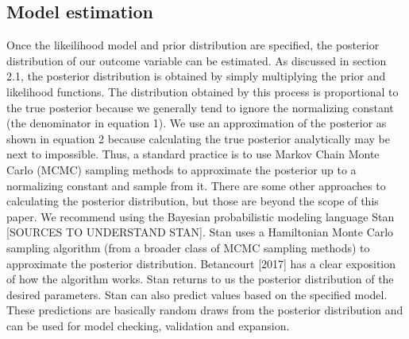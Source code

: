 \documentclass{article}
\begin{document}
\subsection{Model estimation}
Once the likeilihood model and prior distribution are specified, the posterior distribution of our outcome variable can be estimated. As discussed in section 2.1, the posterior distribution is obtained by simply multiplying the prior and likelihood functions. The distribution obtained by this process is proportional to the true posterior because we generally tend to ignore the normalizing constant (the denominator in equation 1). We use an approximation of the posterior as shown in equation 2 because calculating the true posterior analytically may be next to impossible.  Thus, a standard practice is to use Markov Chain Monte Carlo (MCMC) sampling methods to approximate the posterior up to a normalizing constant and sample from it. There are some other approaches to calculating the posterior distribution, but those are beyond the scope of this paper. We recommend using the Bayesian probabilistic modeling language Stan [SOURCES TO UNDERSTAND STAN]. Stan uses a Hamiltonian Monte Carlo sampling algorithm (from a broader class of MCMC sampling methods) to approximate the posterior distribution. Betancourt [2017] has a clear exposition of how the algorithm works. Stan returns to us the posterior distribution of the desired parameters. Stan can also predict values based on the specified model. These predictions are basically random draws from the posterior distribution and can be used for model checking, validation and expansion.
\end{document}

